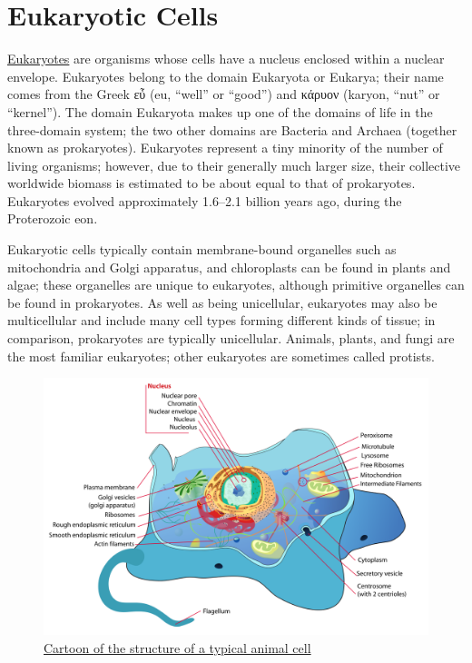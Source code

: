 \hypertarget{eukaryotic-cells}{%
\section{Eukaryotic Cells}\label{eukaryotic-cells}}

\href{https://en.wikipedia.org/wiki/Eukaryote}{Eukaryotes} are organisms whose cells have a nucleus enclosed within a nuclear envelope. Eukaryotes belong to the domain Eukaryota or Eukarya; their name comes from the Greek εὖ (eu, ``well'' or ``good'') and κάρυον (karyon, ``nut'' or ``kernel''). The domain Eukaryota makes up one of the domains of life in the three-domain system; the two other domains are Bacteria and Archaea (together known as prokaryotes). Eukaryotes represent a tiny minority of the number of living organisms; however, due to their generally much larger size, their collective worldwide biomass is estimated to be about equal to that of prokaryotes. Eukaryotes evolved approximately 1.6--2.1 billion years ago, during the Proterozoic eon.

Eukaryotic cells typically contain membrane-bound organelles such as mitochondria and Golgi apparatus, and chloroplasts can be found in plants and algae; these organelles are unique to eukaryotes, although primitive organelles can be found in prokaryotes. As well as being unicellular, eukaryotes may also be multicellular and include many cell types forming different kinds of tissue; in comparison, prokaryotes are typically unicellular. Animals, plants, and fungi are the most familiar eukaryotes; other eukaryotes are sometimes called protists.



\begin{figure}

{\centering \includegraphics[width=0.7\linewidth]{./figures/cells/Animal_cell_structure_en} 

}

\caption{\href{https://commons.wikimedia.org/wiki/File:Animal_cell_structure_en.svg}{Cartoon of the structure of a typical animal cell}}\label{fig:typicalanimalcell}
\end{figure}




